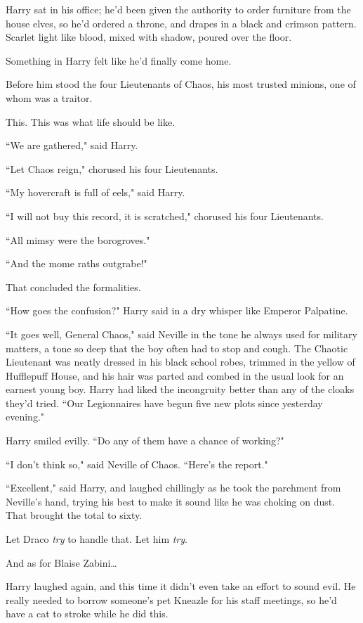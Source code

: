 Harry sat in his office; he'd been given the authority to order furniture from the house elves, so he'd ordered a throne, and drapes in a black and crimson pattern. Scarlet light like blood, mixed with shadow, poured over the floor.

Something in Harry felt like he'd finally come home.

Before him stood the four Lieutenants of Chaos, his most trusted minions, one of whom was a traitor.

This. This was what life should be like.

``We are gathered," said Harry.

``Let Chaos reign," chorused his four Lieutenants.

``My hovercraft is full of eels," said Harry.

``I will not buy this record, it is scratched," chorused his four Lieutenants.

``All mimsy were the borogroves."

``And the mome raths outgrabe!"

That concluded the formalities.

``How goes the confusion?" Harry said in a dry whisper like Emperor Palpatine.

``It goes well, General Chaos," said Neville in the tone he always used for military matters, a tone so deep that the boy often had to stop and cough. The Chaotic Lieutenant was neatly dressed in his black school robes, trimmed in the yellow of Hufflepuff House, and his hair was parted and combed in the usual look for an earnest young boy. Harry had liked the incongruity better than any of the cloaks they'd tried. ``Our Legionnaires have begun five new plots since yesterday evening."

Harry smiled evilly. ``Do any of them have a chance of working?"

``I don't think so," said Neville of Chaos. ``Here's the report."

``Excellent," said Harry, and laughed chillingly as he took the parchment from Neville's hand, trying his best to make it sound like he was choking on dust. That brought the total to sixty.

Let Draco \emph{try} to handle that. Let him \emph{try}.

And as for Blaise Zabini{\ldots}

Harry laughed again, and this time it didn't even take an effort to sound evil. He really needed to borrow someone's pet Kneazle for his staff meetings, so he'd have a cat to stroke while he did this.

